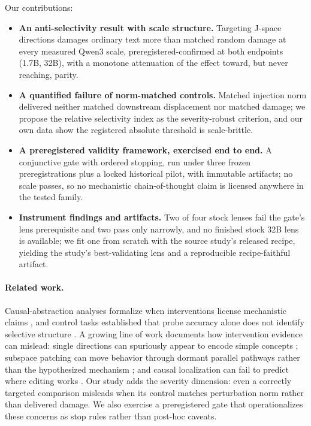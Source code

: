 \documentclass{article}
\newcommand{\jspace}{J-space}
\begin{document}
Our contributions:
\begin{itemize}
  \item \textbf{An anti-selectivity result with scale structure.} Targeting \jspace{}
    directions damages ordinary text more than matched random damage at every measured
    Qwen3 scale, preregistered-confirmed at both endpoints (1.7B, 32B), with a monotone
    attenuation of the effect toward, but never reaching, parity.
  \item \textbf{A quantified failure of norm-matched controls.} Matched injection norm
    delivered neither matched downstream displacement nor matched damage; we propose the
    relative selectivity index as the severity-robust criterion, and our own data show
    the registered absolute threshold is scale-brittle.
  \item \textbf{A preregistered validity framework, exercised end to end.} A conjunctive
    gate with ordered stopping, run under three frozen preregistrations plus a locked
    historical pilot, with immutable artifacts; no scale passes, so no mechanistic chain-of-thought claim is licensed
    anywhere in the tested family.
  \item \textbf{Instrument findings and artifacts.} Two of four stock lenses fail the
    gate's lens prerequisite and two pass only narrowly, and no finished stock 32B
    lens is available; we fit one from scratch with the source study's released recipe,
    yielding the study's best-validating lens and a reproducible recipe-faithful
    artifact.
\end{itemize}

\paragraph{Related work.}
Causal-abstraction analyses formalize when interventions license mechanistic claims
\citep{geiger2021causal}, and control tasks established that probe accuracy alone does not
identify selective structure \citep{hewitt2019controls}. A growing line of work documents
how intervention evidence can mislead: single directions can spuriously appear to encode
simple concepts \citep{bolukbasi2021illusion}; subspace patching can move behavior through
dormant parallel pathways rather than the hypothesized mechanism
\citep{makelov2023illusion}; and causal localization can fail to predict where editing
works \citep{hase2023localization}. Our study adds the severity dimension: even a
correctly targeted comparison misleads when its control matches perturbation norm rather
than delivered damage. We also exercise a preregistered gate that operationalizes these
concerns as stop rules rather than post-hoc caveats.
\end{document}

